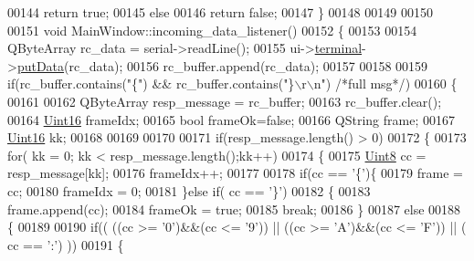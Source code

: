 \begin{DoxyCode}
{00144         \textcolor{keywordflow}{return} \textcolor{keyword}{true};
00145     \textcolor{keywordflow}{else}
00146         \textcolor{keywordflow}{return} \textcolor{keyword}{false};
00147 \}
00148 
00149 
00150 
00151 \textcolor{keywordtype}{void} MainWindow::incoming\_data\_listener()
00152 \{
00153 
00154     QByteArray rc\_data = serial->readLine();
00155     ui->\hyperlink{a00027_aae71c46ea4546df5994735dee573b2dd}{terminal}->\hyperlink{a00002_aa744a0868e01a13a502710f895f01525}{putData}(rc\_data);
00156     rc\_buffer.append(rc\_data);
00157 
00158 
00159     \textcolor{keywordflow}{if}(rc\_buffer.contains(\textcolor{stringliteral}{"\{"}) && rc\_buffer.contains(\textcolor{stringliteral}{"\}\(\backslash\)r\(\backslash\)n"}) \textcolor{comment}{/*full msg*/})
00160     \{
00161 
00162         QByteArray resp\_message = rc\_buffer;
00163         rc\_buffer.clear();
00164         \hyperlink{a00001_aae7407b021d43f7193a81a58cfb3e297}{Uint16}          frameIdx;
00165         \textcolor{keywordtype}{bool}            frameOk=\textcolor{keyword}{false};
00166         QString         frame;
00167         \hyperlink{a00001_aae7407b021d43f7193a81a58cfb3e297}{Uint16}          kk;
00168 
00169 
00170 
00171              \textcolor{keywordflow}{if}(resp\_message.length() > 0)
00172              \{
00173                   \textcolor{keywordflow}{for}( kk = 0; kk < resp\_message.length();kk++)
00174                   \{
00175                       \hyperlink{a00001_a979e3e23b9a449e69ab6a8a83b6042f8}{Uint8} cc = resp\_message[kk];
00176                       frameIdx++;
00177 
00178                       \textcolor{keywordflow}{if}(cc == \textcolor{charliteral}{'\{'})\{
00179                                   frame    = cc;
00180                                   frameIdx = 0;
00181                       \}\textcolor{keywordflow}{else} \textcolor{keywordflow}{if}( cc == \textcolor{charliteral}{'\}'})
00182                       \{
00183                                   frame.append(cc);
00184                                   frameOk = \textcolor{keyword}{true};
00185                                   \textcolor{keywordflow}{break};
00186                       \}
00187                       \textcolor{keywordflow}{else}
00188                       \{
00189 
00190                                    \textcolor{keywordflow}{if}(( ((cc >= \textcolor{charliteral}{'0'})&&(cc <= \textcolor{charliteral}{'9'})) || ((cc >= \textcolor{charliteral}{'A'})&&(cc <= \textcolor{charliteral}{'F'})) || ( cc ==
       \textcolor{charliteral}{':'}) ))
00191                                    \{
}
\end{DoxyCode}
